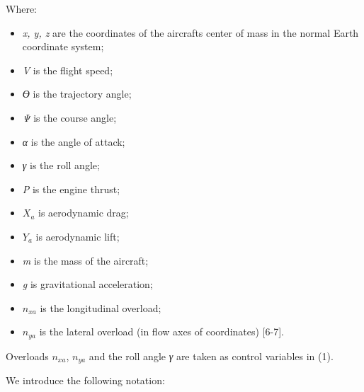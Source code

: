 Where:

\begin{itemize}
\item
  \emph{x, y, z} are the coordinates of the aircraft\textquotesingle s
  center of mass in the normal Earth coordinate system;
\item
  \emph{V} is the flight speed;
\item
  \emph{ϴ} is the trajectory angle;
\item
  \emph{Ψ} is the course angle;
\item
  \emph{α} is the angle of attack;
\item
  \emph{γ} is the roll angle;
\item
  \emph{P} is the engine thrust;
\item
  \(X_{a}\) is aerodynamic drag;
\item
  \(Y_{a}\) is aerodynamic lift;
\item
  \emph{m} is the mass of the aircraft;
\item
  \emph{g} is gravitational acceleration;
\item
  \(n_{xa}\) is the longitudinal overload;
\item
  \(n_{ya}\) is the lateral overload (in flow axes of coordinates)
  {[}6-7{]}.
\end{itemize}

Overloads \(n_{xa}\), \(n_{ya}\) and the roll angle \emph{γ} are taken
as control variables in (1).

We introduce the following notation:

